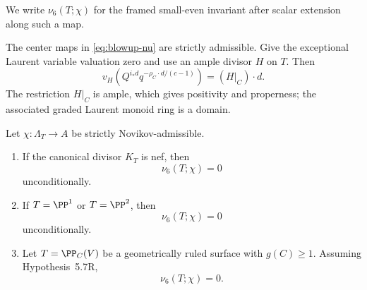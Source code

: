 We write \(\nu_6(T;\chi)\) for the framed small-even invariant after scalar
extension along such a map.

The center maps in \eqref{eq:blowup-nu} are strictly admissible.  Give the exceptional
Laurent variable valuation zero and use an ample divisor \(H\) on \(T\).  Then
\[
 v_H\!\left(Q^{i_*d}q^{-\rho_C\cdot d/(c-1)}\right)
 =(H|_C)\cdot d.
\]
The restriction \(H|_C\) is ample, which gives positivity and properness; the
associated graded Laurent monoid ring is a domain.

\begin{proposition}
\label{prop:direct-specialized-lowdim}
%
%
Let \(\chi:\Lambda_T\to A\) be strictly Novikov-admissible.
\begin{enumerate}[label=(\roman*)]
\item If the canonical divisor \(K_T\) is nef, then
\[
  \nu_6(T;\chi)=0
\]
unconditionally.
\item If \(T=\PP^1\) or \(T=\PP^2\), then
\[
  \nu_6(T;\chi)=0
\]
unconditionally.
\item Let \(T=\PP_C(V)\) be a geometrically ruled surface with
\(g(C)\ge1\).  Assuming Hypothesis~5.7R,
\[
  \nu_6(T;\chi)=0.
\]
\end{enumerate}
\end{proposition}

